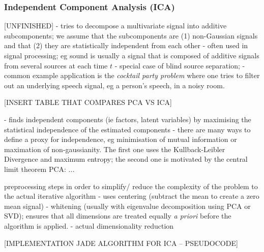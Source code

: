 \documentclass[journal, a4paper]{IEEEtran}
\begin{document}
\subsubsection{Independent Component Analysis (ICA)}
[UNFINISHED]
- tries to decompose a multivariate signal into additive subcomponents;
we assume that the subcomponents are (1) non-Gaussian signals and that (2) they are statistically independent from each other
- often used in signal processing; eg sound is usually a signal that is composed of additive signals from several sources at each time \( t \)
- special case of blind source separation;
- common example application is the \textit{cocktail party problem} where one tries to filter out an underlying speech signal, eg a person's speech, in a noisy room. 


[INSERT TABLE THAT COMPARES PCA VS ICA] 



- finds independent components (ie factors, latent variables) by maximising the statistical independence of the estimated components
- there are many ways to define a proxy for independence, eg minimisation of mutual information or maximation of non-gaussianity. The first one uses the Kullback-Leibler Divergence and maximum entropy; the second one is motivated by the central limit theorem %
PCA:
...

preprocessing steps in order to simplify/ reduce the complexity of the problem to the actual iterative algorithm
- uses centering (subtract the mean to create a zero mean signal)
- whitening (usually with eigenvalue decomposition using PCA or SVD); ensures that all dimensions are treated equally \textit{a priori} before the algorithm is applied. 
- actual dimensionality reduction 

[IMPLEMENTATION JADE ALGORITHM FOR ICA -- PSEUDOCODE]


\end{document}
